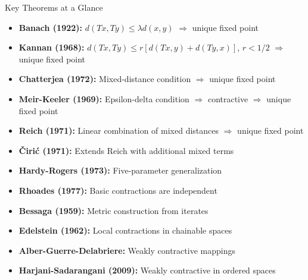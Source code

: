 \documentclass[aspectratio=169,10pt]{beamer}
\begin{document}
\begin{frame}[allowframebreaks]{Key Theorems at a Glance}
  \begin{itemize}
    \item \textbf{Banach (1922):} $d(Tx,Ty) \leq \lambda d(x,y)$ $\Rightarrow$ unique fixed point

    \item \textbf{Kannan (1968):} $d(Tx,Ty) \leq r[d(Tx,y) + d(Ty,x)]$, $r < 1/2$ $\Rightarrow$ unique fixed point

    \item \textbf{Chatterjea (1972):} Mixed-distance condition $\Rightarrow$ unique fixed point

    \item \textbf{Meir-Keeler (1969):} Epsilon-delta condition $\Rightarrow$ contractive $\Rightarrow$ unique fixed point

    \item \textbf{Reich (1971):} Linear combination of mixed distances $\Rightarrow$ unique fixed point

    \item \textbf{Čirić (1971):} Extends Reich with additional mixed terms

    \item \textbf{Hardy-Rogers (1973):} Five-parameter generalization

    \item \textbf{Rhoades (1977):} Basic contractions are independent

    \item \textbf{Bessaga (1959):} Metric construction from iterates

    \item \textbf{Edelstein (1962):} Local contractions in chainable spaces

    \item \textbf{Alber-Guerre-Delabriere:} Weakly contractive mappings

    \item \textbf{Harjani-Sadarangani (2009):} Weakly contractive in ordered spaces
  \end{itemize}
\end{frame}
\end{document}
